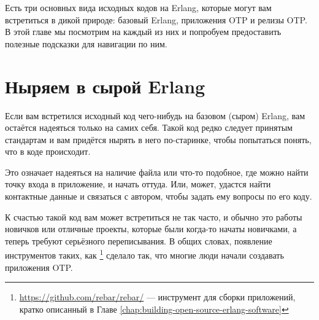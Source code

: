 \documentclass[11pt, oneside]{book}   	%
\begin{document}
Есть три основных вида исходных кодов на Erlang, которые могут вам встретиться в дикой природе: базовый Erlang, приложения OTP и релизы OTP. В этой главе мы посмотрим на каждый из них и попробуем предоставить полезные подсказки для навигации по ним.


\section{Ныряем в сырой Erlang}
\label{sec:dive-raw-erlang}

Если вам встретился исходный код чего-нибудь на базовом (сыром) Erlang, вам остаётся надеяться только на самих себя. Такой код редко следует принятым стандартам и вам придётся нырять в него по-старинке, чтобы попытаться понять, что в коде происходит.

Это означает надеяться на наличие файла  или что-то подобное, где можно найти точку входа в приложение, и начать оттуда. Или, может, удастся найти контактные данные и связаться с автором, чтобы задать ему вопросы по его коду.

К счастью такой код вам может встретиться не так часто, и обычно это работы новичков или отличные проекты, которые были когда-то начаты новичками, а теперь требуют серьёзного переписывания. В общих словах, появление инструментов таких, как \footnote{\href{https://github.com/rebar/rebar/}{https://github.com/rebar/rebar/} — инструмент для сборки приложений, кратко описанный в Главе \ref{chap:building-open-source-erlang-software}} сделало так, что многие люди начали создавать приложения OTP.
\end{document}
